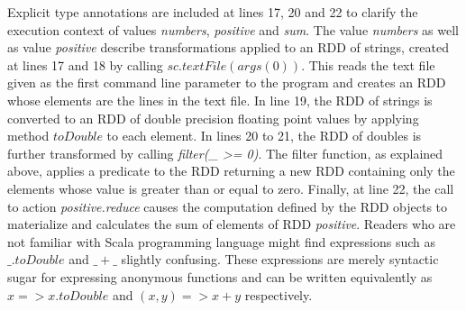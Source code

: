 Explicit type annotations are included at lines 17, 20 and 22 to clarify the execution context of values \textit{numbers}, \textit{positive} and \textit{sum}. The value \textit{numbers} as well as value \textit{positive} describe transformations applied to an RDD of strings, created at lines 17 and 18 by calling $sc.textFile(args(0))$. This reads the text file given as the first command line parameter to the program and creates an RDD whose elements are the lines in the text file. In line 19, the RDD of strings is converted to an RDD of double precision floating point values by applying method $toDouble$ to each element. In lines 20 to 21, the RDD of doubles is further transformed by calling \textit{filter(\_ >= 0)}. The filter function, as explained above, applies a predicate to the RDD returning a new RDD containing only the elements whose value is greater than or equal to zero. Finally, at line 22, the call to action \textit{positive.reduce} causes the computation defined by the RDD objects to materialize and calculates the sum of elements of RDD \textit{positive}. Readers who are not familiar with Scala programming language might find expressions such as $\_.toDouble$ and $\_ + \_$ slightly confusing. These expressions are merely syntactic sugar for expressing anonymous functions and can be written equivalently as $x => x.toDouble$ and $(x, y) => x + y$ respectively.